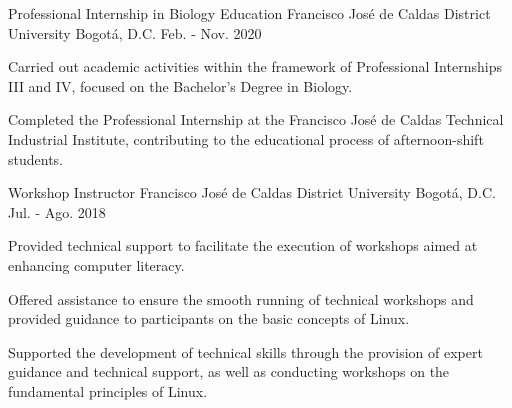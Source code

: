 \begin{cventries}

\cventry
{Professional Internship in Biology Education} %
{Francisco José de Caldas District University} %
{Bogotá, D.C.} %
{Feb. ‑ Nov. 2020} %
{ %
\begin{cvitems}
\item {Carried out academic activities within the framework of Professional Internships III and IV, focused on the Bachelor’s Degree in Biology.}
\item {Completed the Professional Internship at the Francisco José de Caldas Technical Industrial Institute, contributing to the educational process of afternoon-shift students.}
\end{cvitems}
}


\cventry
{Workshop Instructor} %
{Francisco José de Caldas District University} %
{Bogotá, D.C.} %
{Jul. - Ago. 2018} %
{ %
\begin{cvitems}
\item {Provided technical support to facilitate the execution of workshops aimed at enhancing computer literacy.}
\item {Offered assistance to ensure the smooth running of technical workshops and provided guidance to participants on the basic concepts of Linux.}
\item {Supported the development of technical skills through the provision of expert guidance and technical support, as well as conducting workshops on the fundamental principles of Linux.}
\end{cvitems}
}


\end{cventries}